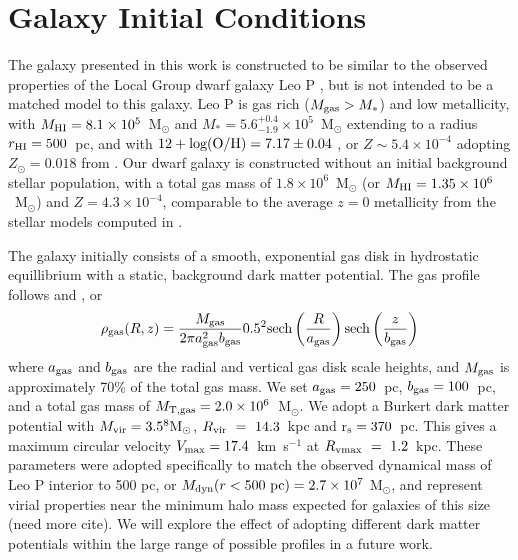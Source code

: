 \documentclass[twocolumn]{aastex61}
\begin{document}
\section{Galaxy Initial Conditions}
\label{sec:IC}
The galaxy presented in this work is constructed to be similar to the observed properties of the Local Group dwarf galaxy Leo P \citep{Giovanelli2013,McQuinn2013,McQuinn2015a,McQuinn2015}, but is not intended to be a matched model to this galaxy. Leo P is gas rich ($M_{\rm gas} > M_{*}$) and low metallicity, with $M_{\rm HI} = 8.1\times 10^{5}$~M$_{\odot}$ and $M_{*} = 5.6^{+0.4}_{-1.9} \times 10^{5}$~M$_{\odot}$ \citep{McQuinn2015a} extending to a radius $r_{\rm HI} = 500$~pc, and with $12 + \rm{log(O/H)} = 7.17 \pm 0.04$ \citep{Skillman2013}, or $Z \sim 5.4\times10^{-4}$ adopting $Z_{\odot} = 0.018$ from \cite{Asplund2009}. Our dwarf galaxy is constructed without an initial background stellar population, with a total gas mass of $1.8 \times 10^{6}$~M$_{\odot}$ (or $M_{\rm HI} = 1.35 \times 10^{6}$~M$_{\odot}$) and $Z = 4.3\times 10^{-4}$, comparable to the average $z = 0$ metallicity from the stellar models computed in \citep{McQuinn2015}.

The galaxy initially consists of a smooth, exponential gas disk in hydrostatic equillibrium with a static, background dark matter potential. The gas profile follows \cite{Tonnesen2009} and \cite{Salem2015}, or
\begin{equation}
\rho_{\rm gas} (R,z) = \frac{M_{\rm gas}}{2\pi a^2_{\rm gas}b_{\rm gas}} 0.5^2{\rm sech}\left(\frac{R}{a_{\rm gas}}\right){\rm sech}\left(\frac{z}{b_{\rm gas}}\right)
\end{equation}
where $a_{\rm gas}$ and $b_{\rm gas}$ are the radial and vertical gas disk scale heights, and $M_{\rm gas}$ is approximately 70\% of the total gas mass. We set $a_{\rm gas} = 250$~pc, $b_{\rm gas} = 100$~pc, and a total gas mass of $M_{\rm T,gas} = 2.0\times 10^6$~M$_{\odot}$. We adopt a Burkert \citet{Burkert1995} dark matter potential with $M_{\rm vir} = 3.5^{8} \rm{M_{\odot}}$, $R_{\rm vir}~=~14.3$~kpc and r$_{\rm s} = 370$~pc. This gives a maximum circular velocity $V_{\rm max} = 17.4$~km~s$^{-1}$ at $R_{\rm vmax}~=~1.2$~kpc. These parameters were adopted specifically to match the observed dynamical mass of Leo P interior to 500 pc, or $M_{\rm dyn} (r < 500~\rm{pc}) = 2.7\times 10^{7}$ M$_{\odot}$, and represent virial properties near the minimum halo mass expected for galaxies of this size \citep{Ferrero2012} (need more cite). We will explore the effect of adopting different dark matter potentials within the large range of possible profiles in a future work.
\end{document}
